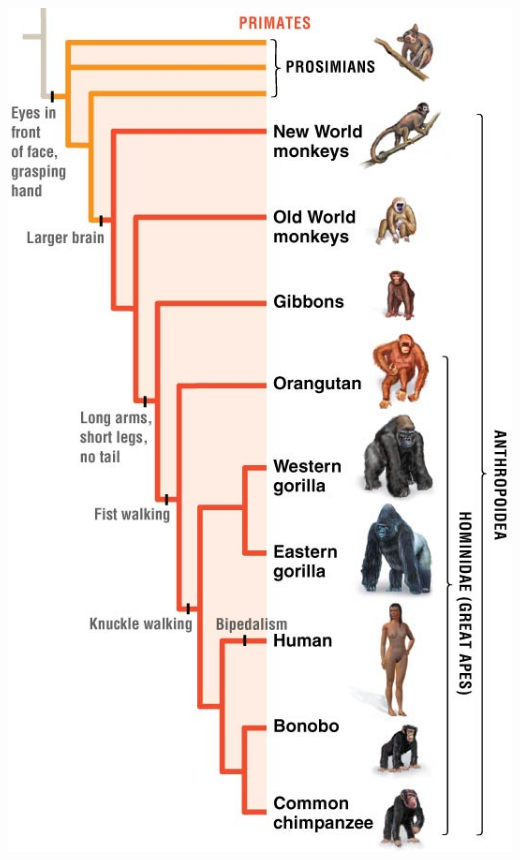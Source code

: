 {\begin{frame}[t]
\begin{adjustwidth}{-2em}{-1.5em}
\begin{columns}[t]
            \vspace{-7mm}
            \begin{center}
                \includegraphics[height=\textheight]{primate-tree.png}
            \end{center}

        \end{columns}
    \end{adjustwidth}
\end{frame}
}

